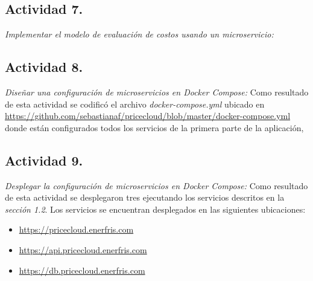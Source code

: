 \subsection{Actividad 7.}
\emph{Implementar el modelo de evaluación de costos usando un microservicio:}\newline\newline

\subsection{Actividad 8.}
\emph{Diseñar una configuración de microservicios en \gls{Docker Compose}:}
\newline\newline
 Como resultado de esta actividad se codificó el archivo \emph{docker-compose.yml} ubicado en \url{https://github.com/sebastianaf/pricecloud/blob/master/docker-compose.yml} donde están configurados todos los servicios de la primera parte de la aplicación,

\subsection{Actividad 9.}
\emph{Desplegar la configuración de microservicios en \gls{Docker Compose}:}
\newline\newline
Como resultado de esta actividad se desplegaron tres  ejecutando los servicios descritos en la \emph{sección 1.2}.
\newline\newline
Los servicios se encuentran desplegados en las siguientes ubicaciones:
\begin{itemize}
    \item \url{https://pricecloud.enerfris.com}
    \item \url{https://api.pricecloud.enerfris.com}
    \item \url{https://db.pricecloud.enerfris.com}
\end{itemize}


\newpage

